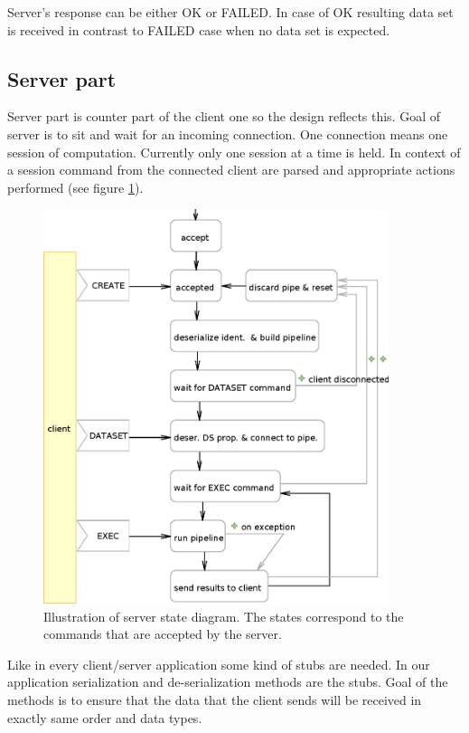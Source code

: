 Server's response can be either OK or FAILED.
In case of OK resulting data set is received in contrast to FAILED case when no data set is expected.

\subsection{Server part}

Server part is counter part of the client one so the design reflects this.
Goal of server is to sit and wait for an incoming connection.
One connection means one session of computation.
Currently only one session at a time is held.
In context of a session command from the connected client are parsed and appropriate actions performed (see figure \ref{fg:RCServerCycle}).

\begin{figure}
    \centering
    \includegraphics[width=0.9\textwidth]{data/RCServerCycle}
    \caption[MedV4D server cycle]
{
Illustration of server state diagram.
The states correspond to the commands that are accepted by the server.
}
    \label{fg:RCServerCycle}
\end{figure}

\par
Like in every client/server application some kind of stubs are needed.
In our application serialization and de-serialization methods are the stubs.
Goal of the methods is to ensure that the data that the client sends will be received in exactly same order and data types.

